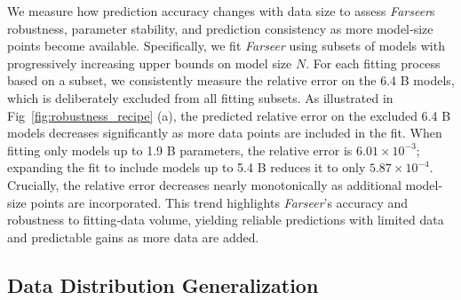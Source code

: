 \documentclass{article}
\begin{document}
We measure how prediction accuracy changes with data size to assess \textit{Farseer}s robustness, parameter stability, and prediction consistency as more model‐size points become available. Specifically, we fit \textit{Farseer} using subsets of models with progressively increasing upper bounds on model size $N$. For each fitting process based on a subset, we consistently measure the relative error on the 6.4 B models, which is deliberately excluded from all fitting subsets. As illustrated in Fig~\ref{fig:robustness_recipe} (a), the predicted relative error on the excluded 6.4 B models decreases significantly as more data points are included in the fit. 
When fitting only models up to 1.9 B parameters, the relative error is $6.01\times10^{-3}$; expanding the fit to include models up to 5.4 B reduces it to only $5.87\times10^{-4}$. 
Crucially, the relative error decreases nearly monotonically as additional model-size points are incorporated. 
This trend highlights \textit{Farseer}’s accuracy and robustness to fitting‐data volume, yielding reliable predictions with limited data and predictable gains as more data are added.



\subsection{Data Distribution Generalization} \label{sec:data_generalization}

\end{document}
